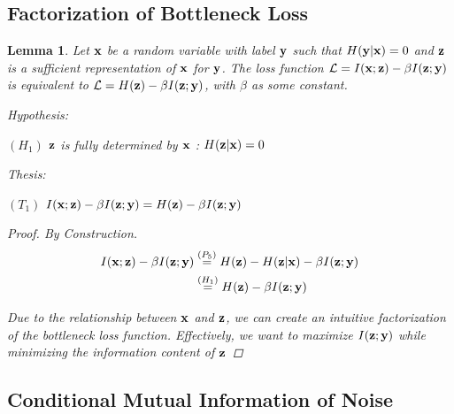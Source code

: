 \documentclass[letterpaper]{article} %
\theoremstyle{plain}
\newtheorem{lemma}[theorem]{Lemma}
\theoremstyle{definition}
\theoremstyle{remark}
\begin{document}
\subsection{Factorization of Bottleneck Loss}

\begin{lemma}
    Let ${\mathbf{x}}$ be a random variable with label ${\mathbf{y}}$ such that $H({\mathbf{y}}| {\mathbf{x}}) = 0$ and ${\mathbf{z}}$ is a sufficient representation of ${\mathbf{x}}$ for ${\mathbf{y}}$. The loss function 
    $\mathcal{L}=I({\mathbf{x}}; {\mathbf{z}})-\beta I({\mathbf{z}}; {\mathbf{y}})$ is equivalent to $\mathcal{L}=H({\mathbf{z}})-\beta I({\mathbf{z}}; {\mathbf{y}})$, with $\beta$ as some constant. 

    Hypothesis: 
    
    $(H_1)$  ${\mathbf{z}}$ is fully determined by ${\mathbf{x}}$ : $H({\mathbf{z}}|{\mathbf{x}}) = 0$

    Thesis: 

    $(T_1)$ $ I({\mathbf{x}}; {\mathbf{z}})-\beta I({\mathbf{z}}; {\mathbf{y}}) = H({\mathbf{z}})-\beta I({\mathbf{z}}; {\mathbf{y}})$

    \begin{proof} By Construction. 
    $$
        \begin{aligned}
        I({\mathbf{x}}; {\mathbf{z}})-\beta I({\mathbf{z}}; {\mathbf{y}}) &\stackrel{\left(P_5\right)}{=} H({\mathbf{z}}) - H({\mathbf{z}}| {\mathbf{x}}) -\beta I({\mathbf{z}};{\mathbf{y}}) \\
        &\stackrel{\left(H_1\right)}{=} H({\mathbf{z}}) -\beta I({\mathbf{z}}; {\mathbf{y}})
        \end{aligned}
    $$

    Due to the relationship between ${\mathbf{x}}$ and ${\mathbf{z}}$, we can create an intuitive factorization of the bottleneck loss function. Effectively, we want to maximize $I({\mathbf{z}}; {\mathbf{y}})$ while minimizing the information content of ${\mathbf{z}}$

    \end{proof}

    \label{lossfact}
\end{lemma}

\subsection{Conditional Mutual Information of Noise}
\end{document}
